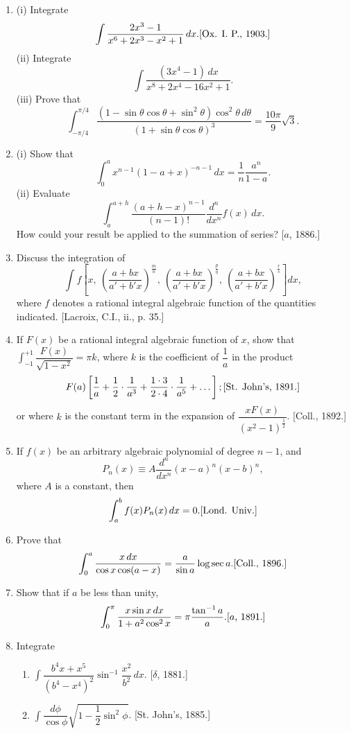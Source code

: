 \documentclass[11pt, a4paper]{article}
\newcommand{\source}[1]{\hfill\textnormal{[#1]}}
\begin{document}
\begin{enumerate}[leftmargin=2em]
\item (i) Integrate
\[
\int \dfrac{2x^3-1}{x^6+2x^3-x^2+1}\,dx. \source{Ox. I. P., 1903.}
\]
(ii) Integrate
\[
\int \dfrac{(3x^4-1)\,dx}{x^8+2x^4-16x^2+1}.
\]
(iii) Prove that
\[
\int_{-\pi/4}^{\pi/4} \dfrac{(1-\sin\theta\cos\theta+\sin^2\theta)\cos^2\theta\,d\theta}{(1+\sin\theta\cos\theta)^3}=\dfrac{10\pi}{9}\sqrt3.
\]

\item (i) Show that
\[
\int_0^a x^{n-1}(1-a+x)^{-n-1}\,dx=\dfrac1n\dfrac{a^n}{1-a}.
\]
(ii) Evaluate
\[
\int_a^{a+h} \dfrac{(a+h-x)^{n-1}}{(n-1)!}\dfrac{d^n}{dx^n}f(x)\,dx.
\]
How could your result be applied to the summation of series? \source{$a$, 1886.}

\item Discuss the integration of
\[
\int f\left[x,\ \left(\dfrac{a+bx}{a'+b'x}\right)^{\frac{m}{n}},\ \left(\dfrac{a+bx}{a'+b'x}\right)^{\frac{p}{q}},\ \left(\dfrac{a+bx}{a'+b'x}\right)^{\frac{r}{s}}\right]dx,
\]
where $f$ denotes a rational integral algebraic function of the quantities indicated. \source{Lacroix, C.I., ii., p. 35.}

\item If $F(x)$ be a rational integral algebraic function of $x$, show that $\displaystyle\int_{-1}^{+1}\dfrac{F(x)}{\sqrt{1-x^2}}=\pi k$, where $k$ is the coefficient of $\dfrac1a$ in the product
\[
F(a)\left[\dfrac1a+\dfrac12\cdot\dfrac{1}{a^3}+\dfrac{1\cdot3}{2\cdot4}\cdot\dfrac{1}{a^5}+\dots\right]; \source{St. John's, 1891.}
\]
or where $k$ is the constant term in the expansion of $\dfrac{xF(x)}{(x^2-1)^{\frac12}}$. \source{Coll., 1892.}

\item If $f(x)$ be an arbitrary algebraic polynomial of degree $n-1$, and
\[
P_n(x)\equiv A\dfrac{d^n}{dx^n}(x-a)^n(x-b)^n,
\]
where $A$ is a constant, then
\[
\int_a^b f(x)P_n(x)\,dx=0. \source{Lond. Univ.}
\]

\item Prove that
\[
\int_0^a \dfrac{x\,dx}{\cos x\cos(a-x)}=\dfrac{a}{\sin a}\log\sec a. \source{Coll., 1896.}
\]

\item Show that if $a$ be less than unity,
\[
\int_0^\pi \dfrac{x\sin x\,dx}{1+a^2\cos^2x}=\pi\dfrac{\tan^{-1}a}{a}. \source{$a$, 1891.}
\]

\item Integrate
\begin{enumerate}[label=(\roman*)]
\item $\displaystyle\int \dfrac{b^4x+x^5}{(b^4-x^4)^2}\sin^{-1}\dfrac{x^2}{b^2}\,dx$. \source{$\delta$, 1881.}
\item $\displaystyle\int \dfrac{d\phi}{\cos\phi}\sqrt{1-\dfrac12\sin^2\phi}$. \source{St. John's, 1885.}
\end{enumerate}


\end{enumerate}
\end{document}
